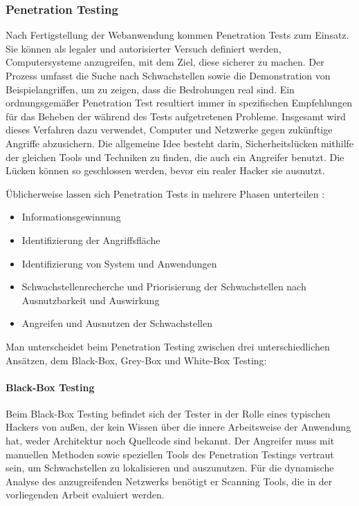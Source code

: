 \documentclass[12pt,oneside,a4paper,parskip,pointlessnumbers]{scrbook}
\begin{document}
    \subsubsection{Penetration Testing}
    Nach Fertigstellung der Webanwendung kommen Penetration Tests zum Einsatz. Sie können als legaler und autorisierter Versuch definiert werden, Computersysteme anzugreifen, mit dem Ziel, diese sicherer zu machen.
    Der Prozess umfasst die Suche nach Schwachstellen sowie die Demonstration von Beispielangriffen, um zu zeigen, dass die Bedrohungen real sind.
    Ein ordnungsgemäßer Penetration Test resultiert immer in spezifischen Empfehlungen für das
    Beheben der während des Tests aufgetretenen Probleme.
    Insgesamt wird dieses Verfahren dazu verwendet, Computer und Netzwerke gegen zukünftige Angriffe abzusichern. Die allgemeine Idee besteht darin, Sicherheitslücken mithilfe der gleichen Tools und Techniken zu finden, die auch ein Angreifer benutzt. Die Lücken können so geschlossen werden, bevor ein realer Hacker sie ausnutzt. \cite{engebretson}

    Üblicherweise lassen sich Penetration Tests in mehrere Phasen unterteilen \cite{BSI}:

    \begin{itemize}
      \item Informationsgewinnung
      \item Identifizierung der Angriffsfläche
      \item Identifizierung von System und Anwendungen
      \item Schwachstellenrecherche und Priorisierung der Schwachstellen nach Ausnutzbarkeit und Auswirkung
      \item Angreifen und Ausnutzen der Schwachstellen
    \end{itemize}

    Man unterscheidet beim Penetration Testing zwischen drei unterschiedlichen Ansätzen, dem Black-Box, Grey-Box und White-Box Testing:
    \paragraph{Black-Box Testing}
    Beim Black-Box Testing befindet sich der Tester in der Rolle eines typischen Hackers von
    außen, der kein Wissen über die innere Arbeitsweise der Anwendung hat, weder Architektur noch
    Quellcode sind bekannt. Der Angreifer muss mit manuellen Methoden sowie speziellen Tools des Penetration Testings vertraut sein, um Schwachstellen zu lokalisieren und auszunutzen. Für die dynamische Analyse des anzugreifenden Netzwerks benötigt er Scanning Tools, die in der vorliegenden Arbeit evaluiert werden.
\end{document}
